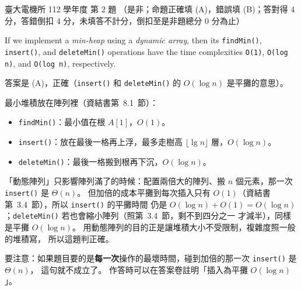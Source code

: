 \begin{pastexam}[label={px:ntu-112-ee-ds-02}]{臺大電機所 112 學年度 第 2 題}
（是非；命題正確填 (A)，錯誤填 (B)；答對得 4 分，答錯倒扣 4 分，未填答不計分，倒扣至是非題總分 0 分為止）

If we implement a \textit{min-heap} using a \textit{dynamic array}, then its \texttt{findMin()}, \texttt{insert()}, and \texttt{deleteMin()} operations have the time complexities \texttt{O(1)}, \texttt{O(log n)}, and \texttt{O(log n)}, respectively.
\end{pastexam}

\begin{pastsoln}
答案是 (A)，正確（\texttt{insert()} 和 \texttt{deleteMin()} 的 $O(\log n)$ 是平攤的意思）。

最小堆積放在陣列裡（資結書第~8.1~節）：
\begin{itemize}
\item \texttt{findMin()}：最小值在根 $A[1]$，$O(1)$。
\item \texttt{insert()}：放在最後一格再上浮，最多走樹高 $\lfloor \lg n \rfloor$ 層，$O(\log n)$。
\item \texttt{deleteMin()}：最後一格搬到根再下沉，$O(\log n)$。
\end{itemize}
「動態陣列」只影響陣列滿了的時候：配置兩倍大的陣列、搬 $n$ 個元素，那一次 \texttt{insert()} 是
$\Theta(n)$。 但加倍的成本平攤到每次插入只有 $O(1)$（資結書第~3.4~節），所以 \texttt{insert()} 的平攤時間
仍是 $O(\log n) + O(1) = O(\log n)$；\texttt{deleteMin()} 若也會縮小陣列（照第~3.4~節，剩不到四分之一
才減半），同樣是平攤 $O(\log n)$。 用動態陣列的目的正是讓堆積大小不受限制，複雜度照一般的堆積寫，
所以這題判正確。

要注意：如果題目要的是\textbf{每一次}操作的最壞時間，碰到加倍的那一次 \texttt{insert()} 是 $\Theta(n)$，
這句就不成立了。 作答時可以在答案卷註明「插入為平攤 $O(\log n)$」。
\end{pastsoln}

